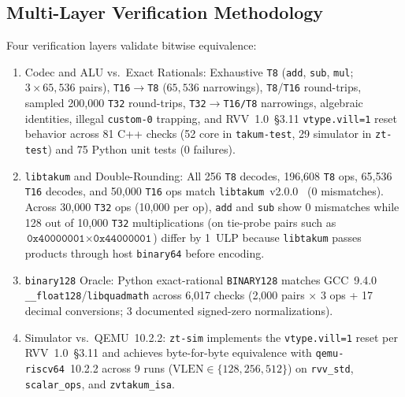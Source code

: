 \documentclass[conference]{IEEEtran}
\begin{document}
\subsection{Multi-Layer Verification Methodology}
Four verification layers validate bitwise equivalence:
\begin{enumerate}
    \item Codec and ALU vs.\ Exact Rationals: Exhaustive \texttt{T8} (\texttt{add}, \texttt{sub}, \texttt{mul}; $3\times 65{,}536$ pairs), \texttt{T16$\to$T8} ($65{,}536$ narrowings), \texttt{T8}/\texttt{T16} round-trips, sampled 200,000 \texttt{T32} round-trips, \texttt{T32$\to$T16/T8} narrowings, algebraic identities, illegal \texttt{custom-0} trapping, and RVV~1.0~\S3.11 \texttt{vtype.vill=1} reset behavior across 81 C++ checks (52 core in \texttt{takum-test}, 29 simulator in \texttt{zt-test}) and 75 Python unit tests (0 failures).
    \item \texttt{libtakum} and Double-Rounding: All 256 \texttt{T8} decodes, 196,608 \texttt{T8} ops, 65,536 \texttt{T16} decodes, and 50,000 \texttt{T16} ops match \texttt{libtakum}~v2.0.0~\cite{libtakum} (0 mismatches). Across 30,000 \texttt{T32} ops (10,000 per op), \texttt{add} and \texttt{sub} show 0 mismatches while 128 out of 10,000 \texttt{T32} multiplications (on tie-probe pairs such as $\texttt{0x40000001} \times \texttt{0x44000001}$) differ by 1~ULP because \texttt{libtakum} passes products through host \texttt{binary64} before encoding.
    \item \texttt{binary128} Oracle: Python exact-rational \texttt{BINARY128} matches GCC~9.4.0 \texttt{\_\_float128}/\texttt{libquadmath} across 6,017 checks (2,000 pairs $\times$ 3 ops + 17 decimal conversions; 3 documented signed-zero normalizations).
    \item Simulator vs.\ QEMU~10.2.2: \texttt{zt-sim} implements the \texttt{vtype.vill=1} reset per RVV~1.0~\S3.11 and achieves byte-for-byte equivalence with \texttt{qemu-riscv64}~10.2.2 across 9 runs ($\mathrm{VLEN}\in\{128,256,512\}$) on \texttt{rvv\_std}, \texttt{scalar\_ops}, and \texttt{zvtakum\_isa}.
\end{enumerate}
\end{document}
